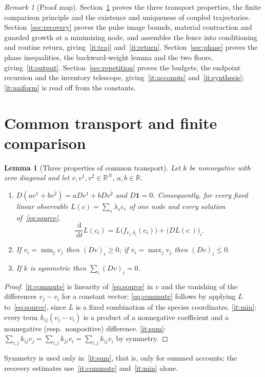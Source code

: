 \documentclass[11pt,a4paper]{article}
\theoremstyle{plain}
\newtheorem{lemma}[theorem]{Lemma}
\theoremstyle{definition}
\theoremstyle{remark}
\newtheorem{remark}[theorem]{Remark}
\newcommand{\R}{\mathbb R}
\newcommand{\dd}{\,\mathrm d}
\newcommand{\Dop}{D}
\begin{document}
\begin{remark}[Proof map]\label{rem:map}
Section~\ref{sec:transport} proves the three transport properties, the finite comparison principle and the existence and uniqueness of coupled trajectories. Section~\ref{sec:recovery} proves the pulse image bounds, material contraction and guarded growth at a minimizing node, and assembles the fence into conditioning and routine return, giving~\ref{it:traj} and~\ref{it:return}. Section~\ref{sec:phase} proves the phase inequalities, the backward-weight lemma and the two floors, giving~\ref{it:output}. Section~\ref{sec:repetition} proves the budgets, the endpoint recursion and the inventory telescope, giving~\ref{it:accounts} and~\ref{it:synthesis}; \ref{it:uniform} is read off from the constants.
\end{remark}

\section{Common transport and finite comparison}\label{sec:transport}

\begin{lemma}[Three properties of common transport]\label{lem:transport}
Let $k$ be nonnegative with zero diagonal and let $v,v^1,v^2\in\R^N$, $a,b\in\R$.
\begin{enumerate}[label=(\roman*)]
\item\label{it:commute} $\Dop(av^1+bv^2)=a\Dop v^1+b\Dop v^2$ and $\Dop\mathbf 1=0$. Consequently, for every fixed linear observable $L(c)=\sum_s\lambda_sc_s$ of one node and every solution of~\eqref{eq:source},
\begin{equation}\label{eq:commute}
\frac{\dd}{\dd t}L(c_i)=L\bigl(f_{r_i,\delta_i}(c_i)\bigr)+\bigl(\Dop L(c_\cdot)\bigr)_i .
\end{equation}
\item\label{it:min} If $v_i=\min_jv_j$ then $(\Dop v)_i\ge0$; if $v_i=\max_jv_j$ then $(\Dop v)_i\le0$.
\item\label{it:sum} If $k$ is symmetric then $\sum_i(\Dop v)_i=0$.
\end{enumerate}
\end{lemma}
\begin{proof}
\ref{it:commute} is linearity of~\eqref{eq:source} in $v$ and the vanishing of the differences $v_j-v_i$ for a constant vector; \eqref{eq:commute} follows by applying $L$ to~\eqref{eq:source}, since $L$ is a fixed combination of the species coordinates. \ref{it:min}: every term $k_{ij}(v_j-v_i)$ is a product of a nonnegative coefficient and a nonnegative (resp.\ nonpositive) difference. \ref{it:sum}: $\sum_{i,j}k_{ij}v_j=\sum_{i,j}k_{ji}v_i=\sum_{i,j}k_{ij}v_i$ by symmetry.
\end{proof}
Symmetry is used only in~\ref{it:sum}, that is, only for summed accounts; the recovery estimates use~\ref{it:commute} and~\ref{it:min} alone.
\end{document}
